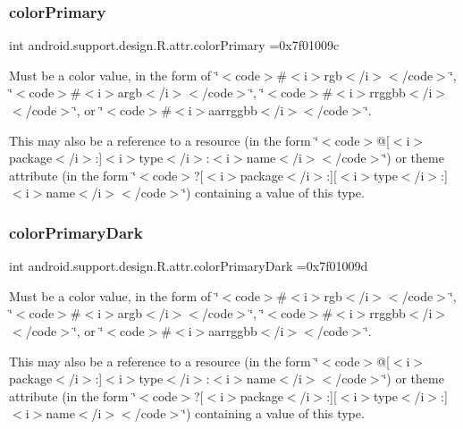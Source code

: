 \subsubsection{\texorpdfstring{color\+Primary}{colorPrimary}}
{\footnotesize\ttfamily int android.\+support.\+design.\+R.\+attr.\+color\+Primary =0x7f01009c\hspace{0.3cm}{\ttfamily [static]}}

Must be a color value, in the form of \char`\"{}$<$code$>$\#$<$i$>$rgb$<$/i$>$$<$/code$>$\char`\"{}, \char`\"{}$<$code$>$\#$<$i$>$argb$<$/i$>$$<$/code$>$\char`\"{}, \char`\"{}$<$code$>$\#$<$i$>$rrggbb$<$/i$>$$<$/code$>$\char`\"{}, or \char`\"{}$<$code$>$\#$<$i$>$aarrggbb$<$/i$>$$<$/code$>$\char`\"{}. 

This may also be a reference to a resource (in the form \char`\"{}$<$code$>$@\mbox{[}$<$i$>$package$<$/i$>$\+:\mbox{]}$<$i$>$type$<$/i$>$\+:$<$i$>$name$<$/i$>$$<$/code$>$\char`\"{}) or theme attribute (in the form \char`\"{}$<$code$>$?\mbox{[}$<$i$>$package$<$/i$>$\+:\mbox{]}\mbox{[}$<$i$>$type$<$/i$>$\+:\mbox{]}$<$i$>$name$<$/i$>$$<$/code$>$\char`\"{}) containing a value of this type. \mbox{\label{classandroid_1_1support_1_1design_1_1R_1_1attr_a1014705e54c4e0b7ae9a29b8116f1124}} 
\subsubsection{\texorpdfstring{color\+Primary\+Dark}{colorPrimaryDark}}
{\footnotesize\ttfamily int android.\+support.\+design.\+R.\+attr.\+color\+Primary\+Dark =0x7f01009d\hspace{0.3cm}{\ttfamily [static]}}

Must be a color value, in the form of \char`\"{}$<$code$>$\#$<$i$>$rgb$<$/i$>$$<$/code$>$\char`\"{}, \char`\"{}$<$code$>$\#$<$i$>$argb$<$/i$>$$<$/code$>$\char`\"{}, \char`\"{}$<$code$>$\#$<$i$>$rrggbb$<$/i$>$$<$/code$>$\char`\"{}, or \char`\"{}$<$code$>$\#$<$i$>$aarrggbb$<$/i$>$$<$/code$>$\char`\"{}. 

This may also be a reference to a resource (in the form \char`\"{}$<$code$>$@\mbox{[}$<$i$>$package$<$/i$>$\+:\mbox{]}$<$i$>$type$<$/i$>$\+:$<$i$>$name$<$/i$>$$<$/code$>$\char`\"{}) or theme attribute (in the form \char`\"{}$<$code$>$?\mbox{[}$<$i$>$package$<$/i$>$\+:\mbox{]}\mbox{[}$<$i$>$type$<$/i$>$\+:\mbox{]}$<$i$>$name$<$/i$>$$<$/code$>$\char`\"{}) containing a value of this type. \mbox{\label{classandroid_1_1support_1_1design_1_1R_1_1attr_a64c4b3a099566cfb653a1354c14bc4dd}} 
